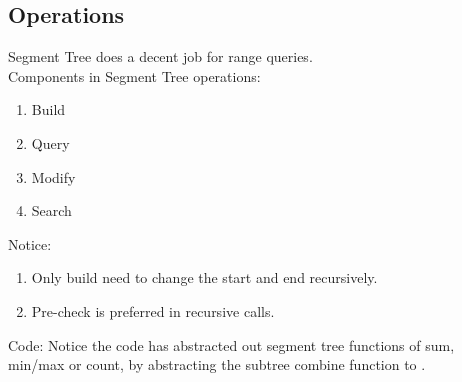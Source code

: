 \subsection{Operations}
Segment Tree does a decent job for range queries.
\\
Components in Segment Tree operations:
\begin{enumerate}
\item Build
\item Query 
\item Modify
\item Search 
\end{enumerate}
Notice:
\begin{enumerate}
\item Only build need to change the start and end recursively.
\item Pre-check is preferred in recursive calls.
\end{enumerate}
Code: Notice the code has abstracted out segment tree functions of sum, min/max or count, by abstracting the subtree combine function to .
